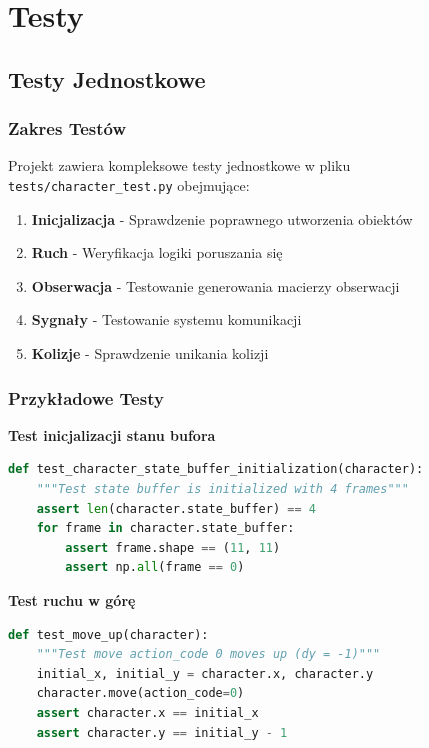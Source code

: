 \documentclass[12pt,a4paper]{article}
\begin{document}
\newpage

\section{Testy}

\subsection{Testy Jednostkowe}

\subsubsection{Zakres Testów}

Projekt zawiera kompleksowe testy jednostkowe w pliku
\texttt{tests/character\_test.py} obejmujące:
\begin{enumerate}
	\item \textbf{Inicjalizacja} - Sprawdzenie poprawnego utworzenia obiektów
	\item \textbf{Ruch} - Weryfikacja logiki poruszania się
	\item \textbf{Obserwacja} - Testowanie generowania macierzy obserwacji
	\item \textbf{Sygnały} - Testowanie systemu komunikacji
	\item \textbf{Kolizje} - Sprawdzenie unikania kolizji
\end{enumerate}

\subsubsection{Przykładowe Testy}

\textbf{Test inicjalizacji stanu bufora}
\begin{lstlisting}[language=Python]
def test_character_state_buffer_initialization(character):
    """Test state buffer is initialized with 4 frames"""
    assert len(character.state_buffer) == 4
    for frame in character.state_buffer:
        assert frame.shape == (11, 11)
        assert np.all(frame == 0)
	\end{lstlisting}

\textbf{Test ruchu w górę}
\begin{lstlisting}[language=Python]
def test_move_up(character):
    """Test move action_code 0 moves up (dy = -1)"""
    initial_x, initial_y = character.x, character.y
    character.move(action_code=0)
    assert character.x == initial_x
    assert character.y == initial_y - 1
	\end{lstlisting}
\end{document}
